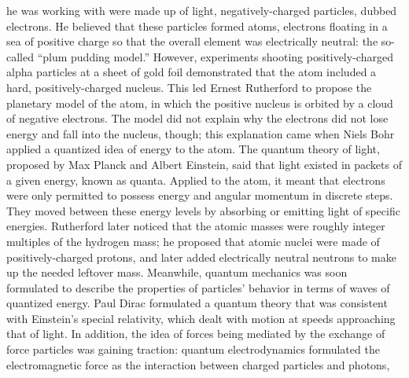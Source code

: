 he was working with were 
made up of light, negatively-charged particles, 
dubbed electrons.  
He believed that these particles formed atoms, 
electrons floating in a sea of positive charge 
so that the overall element was electrically neutral: %
the so-called ``plum pudding model.''  
However, experiments shooting positively-charged 
alpha particles at a sheet of gold foil demonstrated 
that the atom included a hard, positively-charged nucleus.  
This led Ernest Rutherford to propose the 
planetary model of the atom, in which the positive nucleus 
is orbited by a cloud of negative electrons.  
The model did not explain why the electrons did not 
lose energy and fall into the nucleus, though; 
this explanation came when Niels Bohr applied a 
quantized idea of energy to the atom.  
The quantum theory of light, 
proposed by Max Planck and Albert Einstein, 
said that light existed in packets of a given energy, 
known as quanta. 
Applied to the atom, it meant that 
electrons were only permitted to possess 
energy and angular momentum in discrete steps.  
They moved between these energy levels by absorbing 
or emitting light of specific energies.  
Rutherford later noticed that the atomic masses 
were roughly integer multiples of the hydrogen mass; 
he proposed that atomic nuclei were made of 
positively-charged protons, 
and later added electrically neutral neutrons 
to make up the needed leftover mass.  
Meanwhile, quantum mechanics was soon formulated to describe 
the properties of particles' behavior in terms of waves 
of quantized energy.  
Paul Dirac formulated a quantum theory that was consistent 
with Einstein's special relativity, 
which dealt with motion at speeds approaching that of light.  
In addition, the idea of forces being mediated by the exchange 
of force particles was gaining traction: 
quantum electrodynamics formulated the electromagnetic force 
as the interaction between charged particles and photons, 
